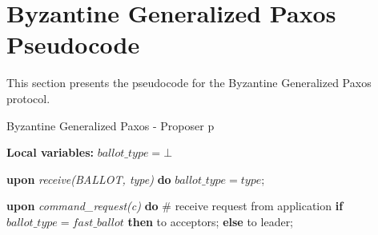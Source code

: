 \section{Byzantine Generalized Paxos Pseudocode} \label{bft_code}
This section presents the pseudocode for the Byzantine Generalized Paxos protocol. 
\begin{algorithm}[h] 
	\caption{Byzantine Generalized Paxos - Proposer p}
	\label{BFT-Prop}
	\textbf{Local variables:} $ballot\_type = \bot$
	\begin{algorithmic}[1]
			
		\State \textbf{upon} \textit{receive(BALLOT, type)} \textbf{do} 
		\State \hspace{\algorithmicindent} $ballot\_type = type$;
		\State
		
		\State \textbf{upon} \textit{command\_request(c)} \textbf{do}   \hspace{\algorithmicindent}\hspace{\algorithmicindent}\hspace{\algorithmicindent}\hspace{\algorithmicindent}\# receive request from application
		\State \hspace{\algorithmicindent} \textbf{if} $ballot\_type = fast\_ballot$ \textbf{then}
		\State \hspace{\algorithmicindent}\hspace{\algorithmicindent}  to acceptors;
		\State \hspace{\algorithmicindent} \textbf{else} 
		\State \hspace{\algorithmicindent}\hspace{\algorithmicindent}  to leader;		
	\end{algorithmic}
\end{algorithm}
